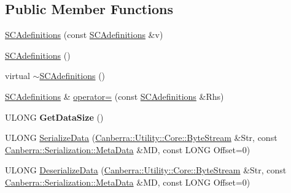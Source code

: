 \subsection*{Public Member Functions}
\begin{DoxyCompactItemize}
\item 
\hyperlink{class_canberra_1_1_data_types_1_1_spectroscopy_1_1_s_c_adefinitions_a3aa68a5091ef949b85009471fd746d12_a3aa68a5091ef949b85009471fd746d12}{S\+C\+Adefinitions} (const \hyperlink{class_canberra_1_1_data_types_1_1_spectroscopy_1_1_s_c_adefinitions}{S\+C\+Adefinitions} \&v)
\item 
\hyperlink{class_canberra_1_1_data_types_1_1_spectroscopy_1_1_s_c_adefinitions_a5e9b60adc6a7e555f06105c72a800c84_a5e9b60adc6a7e555f06105c72a800c84}{S\+C\+Adefinitions} ()
\item 
virtual \hyperlink{class_canberra_1_1_data_types_1_1_spectroscopy_1_1_s_c_adefinitions_a04ba6cd57bb7abe6af4fc2d8d615768d_a04ba6cd57bb7abe6af4fc2d8d615768d}{$\sim$\+S\+C\+Adefinitions} ()
\item 
\hyperlink{class_canberra_1_1_data_types_1_1_spectroscopy_1_1_s_c_adefinitions}{S\+C\+Adefinitions} \& \hyperlink{class_canberra_1_1_data_types_1_1_spectroscopy_1_1_s_c_adefinitions_a5b8c683b55723490051f7d1543d0626e_a5b8c683b55723490051f7d1543d0626e}{operator=} (const \hyperlink{class_canberra_1_1_data_types_1_1_spectroscopy_1_1_s_c_adefinitions}{S\+C\+Adefinitions} \&Rhs)
\item 
\mbox{\label{class_canberra_1_1_data_types_1_1_spectroscopy_1_1_s_c_adefinitions_a368e72df8b3ad470c71d502547c4f0c5}} 
U\+L\+O\+NG {\bfseries Get\+Data\+Size} ()
\item 
U\+L\+O\+NG \hyperlink{class_canberra_1_1_data_types_1_1_spectroscopy_1_1_s_c_adefinitions_a6313646516bbf922f990c2d90b4166a3_a6313646516bbf922f990c2d90b4166a3}{Serialize\+Data} (\hyperlink{class_canberra_1_1_utility_1_1_core_1_1_byte_stream}{Canberra\+::\+Utility\+::\+Core\+::\+Byte\+Stream} \&Str, const \hyperlink{class_canberra_1_1_serialization_1_1_meta_data}{Canberra\+::\+Serialization\+::\+Meta\+Data} \&MD, const L\+O\+NG Offset=0)
\item 
U\+L\+O\+NG \hyperlink{class_canberra_1_1_data_types_1_1_spectroscopy_1_1_s_c_adefinitions_af88eb264ae9d582a9e9fc77d91938308_af88eb264ae9d582a9e9fc77d91938308}{Deserialize\+Data} (\hyperlink{class_canberra_1_1_utility_1_1_core_1_1_byte_stream}{Canberra\+::\+Utility\+::\+Core\+::\+Byte\+Stream} \&Str, const \hyperlink{class_canberra_1_1_serialization_1_1_meta_data}{Canberra\+::\+Serialization\+::\+Meta\+Data} \&MD, const L\+O\+NG Offset=0)

\end{DoxyCompactItemize}
